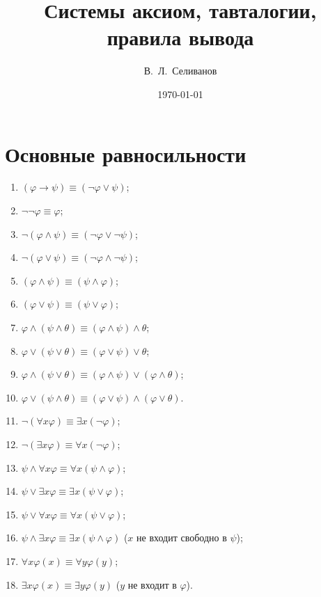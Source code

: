 \documentclass[a4paper,11pt]{article}
\title{Системы аксиом, тавталогии, правила вывода}
\date{\today}
\author{В.~Л.~Селиванов}
\begin{document}
 \maketitle

\section{Основные равносильности}

\begin{enumerate}
\item $(\varphi\rightarrow\psi)\equiv(\neg\varphi\lor\psi)$; 

\item $\neg\neg\varphi\equiv\varphi$;

\item $\neg (\varphi \land \psi)\equiv (\neg\varphi\lor \neg\psi)$;

\item $\neg(\varphi \lor \psi) \equiv(\neg\varphi \land \neg\psi)$;

\item $(\varphi\land\psi) \equiv(\psi \land \varphi)$; 

\item $(\varphi \lor \psi)\equiv(\psi \lor \varphi)$;

\item $\varphi\land(\psi\land\theta)\equiv(\varphi\land\psi)\land\theta$;

\item $\varphi\lor (\psi\lor \theta) \equiv(\varphi \lor \psi) \lor \theta$;

\item $\varphi\land(\psi\lor\theta)\equiv(\varphi\land\psi)\lor(\varphi\land\theta)$; 

\item $\varphi\lor(\psi\land\theta)\equiv(\varphi\lor\psi)\land(\varphi\lor\theta)$.\medskip

\item $\neg(\forall x \varphi)\equiv \exists x (\neg\varphi)$; 

\item $\neg (\exists x \varphi)\equiv \forall x (\neg\varphi)$;

\item $\psi \land \forall x \varphi\equiv \forall x (\psi\land\varphi)$; 

\item $\psi\lor \exists x \varphi \equiv \exists x (\psi \lor \varphi)$;

\item $\psi \lor \forall x \varphi\equiv \forall x (\psi\lor \varphi)$; 

\item $\psi \land\exists x \varphi \equiv\exists x (\psi \land \varphi)$
($x$ не входит свободно в $\psi$);

\item $\forall x \varphi(x) \equiv\forall y \varphi(y)$; 

\item $\exists
x\varphi(x) \equiv \exists y\varphi(y)$
($y$ не входит в $\varphi$).
\end{enumerate}
\end{document}
